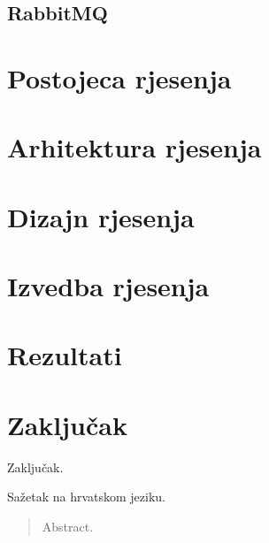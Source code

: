 \documentclass[times, utf8, diplomski, numeric]{fer}
\begin{document}
\section{RabbitMQ}

\chapter{Postojeca rjesenja}

\chapter{Arhitektura rjesenja}

\chapter{Dizajn rjesenja}

\chapter{Izvedba rjesenja}

\chapter{Rezultati}

\chapter{Zaključak}
Zaključak.




\begin{sazetak}
Sažetak na hrvatskom jeziku.

\end{sazetak}

\begin{abstract}
Abstract.

\end{abstract}
\end{document}
